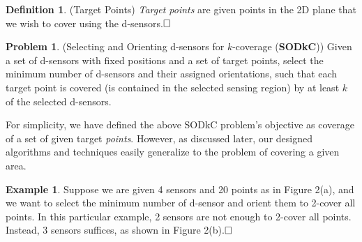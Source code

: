 \documentclass[conference]{IEEEtran}
\theoremstyle{definition}
\newtheorem{problem}{Problem}
\newtheorem{definition}{Definition}
\newtheorem{example}{Example}
\newtheorem*{NP-Hardness of Approximating the SODkC Problem}{NP-Hardness of Approximating the SODkC Problem}
\newtheorem*{Greedy Algorithm (GA)}{Greedy Algorithm (GA)}
\newtheorem*{GA on the Running Example}{GA on the Running Example}
\newtheorem*{Performance Guarantee of GA}{Performance Guarantee of GA}
\begin{document}
\begin{definition}
(Target Points) \textit{Target points} are given points in the 2D plane that we wish to cover using the d-sensors.$\hfill\square$
\end{definition}

\begin{problem}
(Selecting and Orienting d-sensors for $k$-coverage (\textbf{SODkC})) Given a set of d-sensors with fixed positions and a set of target points, select the minimum number of d-sensors and their assigned orientations, such that each target point is covered (is contained in the selected sensing region) by at least $k$ of the selected d-sensors.
\end{problem}

For simplicity, we have defined the above SODkC problem’s objective as coverage of a set of given target \textit{points}. However, as discussed later, our designed algorithms and techniques easily generalize to the problem of covering a given area.

\begin{example}    
Suppose we are given 4 sensors and 20 points as in Figure 2(a), and we want to select the minimum number of d-sensor and orient them to 2-cover all points. In this particular example, 2 sensors are not enough to 2-cover all points. Instead, 3 sensors suffices, as shown in Figure 2(b).$\hfill\square$
\end{example}
\end{document}
